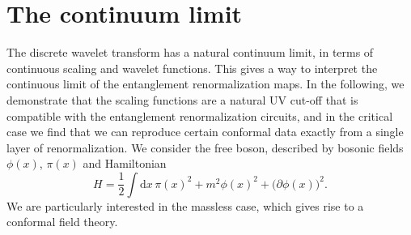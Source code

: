 \documentclass[submission, Phys]{SciPost}
\theoremstyle{definition}
\theoremstyle{remark}
\renewcommand{\d}{\ensuremath{\mathrm{d}}}
\begin{document}
\section{The continuum limit}\label{sec:continuum}
The discrete wavelet transform has a natural continuum limit, in terms of continuous scaling and wavelet functions.
This gives a way to interpret the continuous limit of the entanglement renormalization maps.
In the following, we demonstrate that the scaling functions are a natural UV cut-off that is compatible with the entanglement renormalization circuits, and in the critical case we find that we can reproduce certain conformal data exactly from a single layer of renormalization.
We consider the free boson, described by bosonic fields $\phi(x)$, $\pi(x)$ and Hamiltonian
\begin{equation*}
  H = \frac12 \int \d x \, \pi(x)^2 + m^2\phi(x)^2 + \bigl(\partial\phi(x)\bigr)^2.
\end{equation*}
We are particularly interested in the massless case, which gives rise to a conformal field theory.
\end{document}
